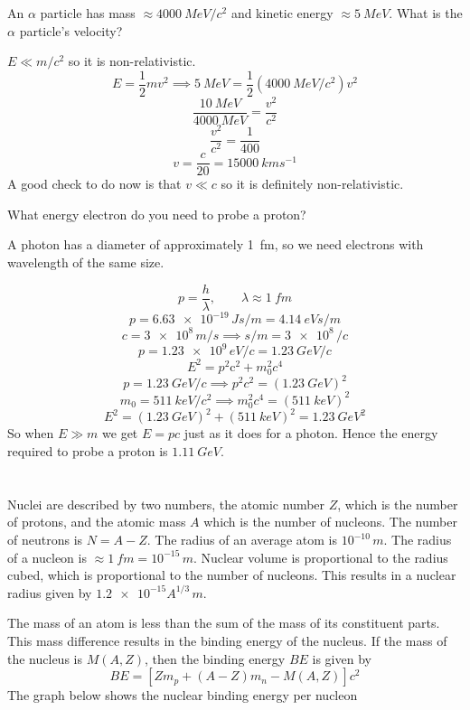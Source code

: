 \begin{example}
An \(\alpha\) particle has mass \(\approx\SI{4000}{MeV/c^2}\) and kinetic energy \(\approx\SI{5}{MeV}\). What is the \(\alpha\) particle's velocity?

\(E\ll m/c^2\) so it is non-relativistic.
\[E=\frac12mv^2\implies\SI{5}{MeV}=\frac12(\SI{4000}{MeV/c^2})v^2\]
\[\frac{\SI{10}{MeV}}{\SI{4000}{MeV}}=\frac{v^2}{\si{c^2}}\]
\[\frac{v^2}{\si{c^2}}=\frac{1}{400}\]
\[v=\frac{\si{c}}{20}=\SI{15000}{km s^{-1}}\]
A good check to do now is that \(v\ll c\) so it is definitely non-relativistic.
\end{example}
\begin{example}
What energy electron do you need to probe a proton?

A photon has a diameter of approximately \SI{1}{fm}, so we need electrons with wavelength of the same size.

\[p=\frac{h}{\lambda},\qquad\lambda\approx\SI{1}{fm}\]
\[p=\num{6.63e-19}\,\si{Js/m}=\SI{4.14}{eVs/m}\]
\[c=\num{3e8}\,\si{m/s}\implies\si{s/m}=\num{3e8}\,\si{/c}\]
\[p=\num{1.23e9}\,\si{eV/c}=\SI{1.23}{GeV/c}\]
\[E^2=p^2\mathrm{c}^2+m_0^2c^4\]
\[p=\SI{1.23}{GeV/c}\implies p^2c^2=(\SI{1.23}{GeV})^2\]
\[m_0=\SI{511}{keV/c^2}\implies m_0^2c^4=(\SI{511}{keV})^2\]
\[E^2=(\SI{1.23}{GeV})^2+(\SI{511}{keV})^2=\SI{1.23}{GeV^2}\]
So when \(E\gg m\) we get \(E=pc\) just as it does for a photon. Hence the energy required to probe a proton is \(\SI{1.11}{GeV}\).
\end{example}

\section{}

Nuclei are described by two numbers, the atomic number \(Z\), which is the number of protons, and the atomic mass \(A\) which is the number of nucleons. The number of neutrons is \(N=A-Z\). The radius of an average atom is \(10^{-10}\,\si{m}\). The radius of a nucleon is \(\approx\SI{1}{fm}=10^{-15}\,\si{m}\). Nuclear volume is proportional to the radius cubed, which is proportional to the number of nucleons. This results in a nuclear radius given by \(\num{1.2e-15}A^{1/3}\,\si{m}\).

The mass of an atom is less than the sum of the mass of its constituent parts. This mass difference results in the binding energy of the nucleus. If the mass of the nucleus is \(M(A,Z)\), then the binding energy \(BE\) is given by
\[BE=[Zm_p+(A-Z)m_n-M(A,Z)]c^2\]
The graph below shows the nuclear binding energy per nucleon

